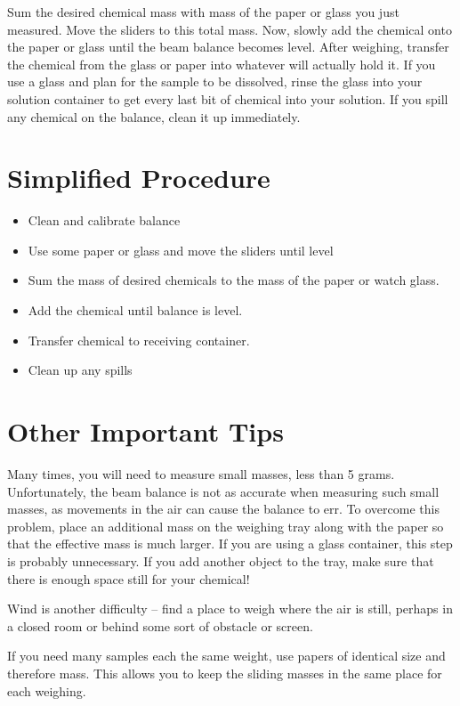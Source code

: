 Sum the desired chemical mass with mass of the paper or glass you just measured. Move the sliders to this total mass. Now, slowly add the chemical onto the paper or glass until the beam balance becomes level. After weighing, transfer the chemical from the glass or paper into whatever will actually hold it. If you use a glass and plan for the sample to be dissolved, rinse the glass into your solution container to get every last bit of chemical into your solution. If you spill any chemical on the balance, clean it up immediately.

\section{Simplified Procedure}

\begin{itemize}

\item{Clean and calibrate balance}
\item{Use some paper or glass and move the sliders until level}
\item{Sum the mass of desired chemicals to the mass of the paper or watch glass.}
\item{Add the chemical until balance is level.}
\item{Transfer chemical to receiving container.}
\item{Clean up any spills}

\end{itemize}

\section{Other Important Tips}

Many times, you will need to measure small masses, less than 5 grams. Unfortunately, the beam balance is not as accurate when measuring such small masses, as movements in the air can cause the balance to err. To overcome this problem, place an additional mass on the weighing tray along with the paper so that the effective mass is much larger. If you are using a glass container, this step is probably unnecessary. If you add another object to the tray, make sure that there is enough space still for your chemical!

Wind is another difficulty – find a place to weigh where the air is still, perhaps in a closed room or behind some sort of obstacle or screen.

If you need many samples each the same weight, use papers of identical size and therefore mass. This allows you to keep the sliding masses in the same place for each weighing.

